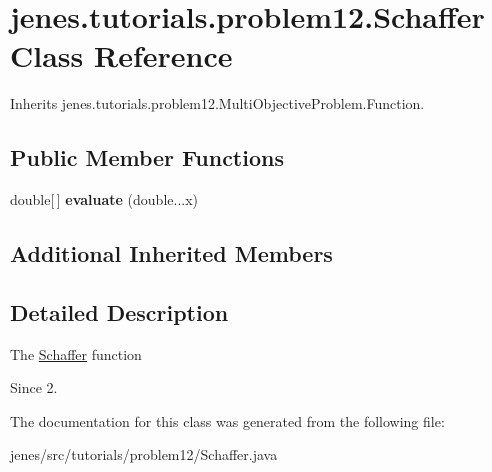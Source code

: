 \hypertarget{classjenes_1_1tutorials_1_1problem12_1_1_schaffer}{\section{jenes.\-tutorials.\-problem12.\-Schaffer Class Reference}
\label{classjenes_1_1tutorials_1_1problem12_1_1_schaffer}
}


Inherits jenes.\-tutorials.\-problem12.\-Multi\-Objective\-Problem.\-Function.

\subsection*{Public Member Functions}
\begin{DoxyCompactItemize}
\item 
\hypertarget{classjenes_1_1tutorials_1_1problem12_1_1_schaffer_a2fef22cd37928de5b342a50a88c72833}{double\mbox{[}$\,$\mbox{]} {\bfseries evaluate} (double...\-x)}\label{classjenes_1_1tutorials_1_1problem12_1_1_schaffer_a2fef22cd37928de5b342a50a88c72833}

\end{DoxyCompactItemize}
\subsection*{Additional Inherited Members}


\subsection{Detailed Description}
The \hyperlink{classjenes_1_1tutorials_1_1problem12_1_1_schaffer}{Schaffer} function

\begin{DoxySince}{Since}
2. 
\end{DoxySince}


The documentation for this class was generated from the following file\-:\begin{DoxyCompactItemize}
\item 
jenes/src/tutorials/problem12/Schaffer.\-java\end{DoxyCompactItemize}
